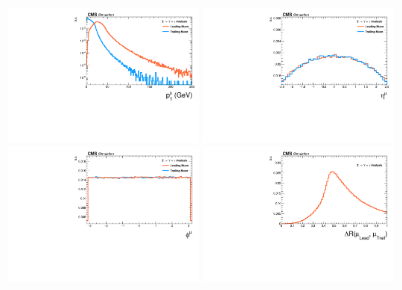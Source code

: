 \begin{figure}[!htbp]
\begin{center}
\includegraphics[width=0.45\textwidth]{figures_and_tables/outputPlots/ZtoUpsilon_Cat0_ZZZZZ/mc/unpolarized/h_Gen_Mu_pt}
\includegraphics[width=0.45\textwidth]{figures_and_tables/outputPlots/ZtoUpsilon_Cat0_ZZZZZ/mc/unpolarized/h_Gen_Mu_eta}
\includegraphics[width=0.45\textwidth]{figures_and_tables/outputPlots/ZtoUpsilon_Cat0_ZZZZZ/mc/unpolarized/h_Gen_Mu_phi}
\includegraphics[width=0.45\textwidth]{figures_and_tables/outputPlots/ZtoUpsilon_Cat0_ZZZZZ/mc/unpolarized/h_Gen_deltaR_Leading_Trailing}

\end{center}
\end{figure}
